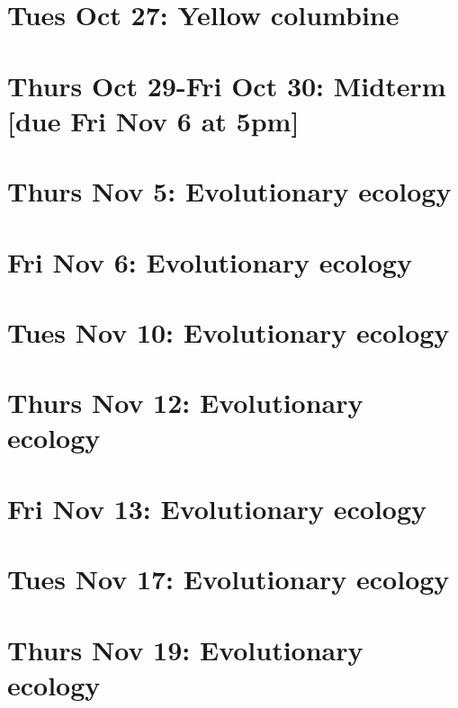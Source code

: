 \documentclass[]{book}
\begin{document}
\chapter{Tues Oct 27: Yellow
columbine}\label{tues-oct-27-yellow-columbine}

\chapter{Thurs Oct 29-Fri Oct 30: Midterm {[}due Fri Nov 6 at
5pm{]}}\label{thurs-oct-29-fri-oct-30-midterm-due-fri-nov-6-at-5pm}

\chapter{Thurs Nov 5: Evolutionary
ecology}\label{thurs-nov-5-evolutionary-ecology}

\chapter{Fri Nov 6: Evolutionary
ecology}\label{fri-nov-6-evolutionary-ecology}

\chapter{Tues Nov 10: Evolutionary
ecology}\label{tues-nov-10-evolutionary-ecology}

\chapter{Thurs Nov 12: Evolutionary
ecology}\label{thurs-nov-12-evolutionary-ecology}

\chapter{Fri Nov 13: Evolutionary
ecology}\label{fri-nov-13-evolutionary-ecology}

\chapter{Tues Nov 17: Evolutionary
ecology}\label{tues-nov-17-evolutionary-ecology}

\chapter{Thurs Nov 19: Evolutionary
ecology}\label{thurs-nov-19-evolutionary-ecology}
\end{document}
